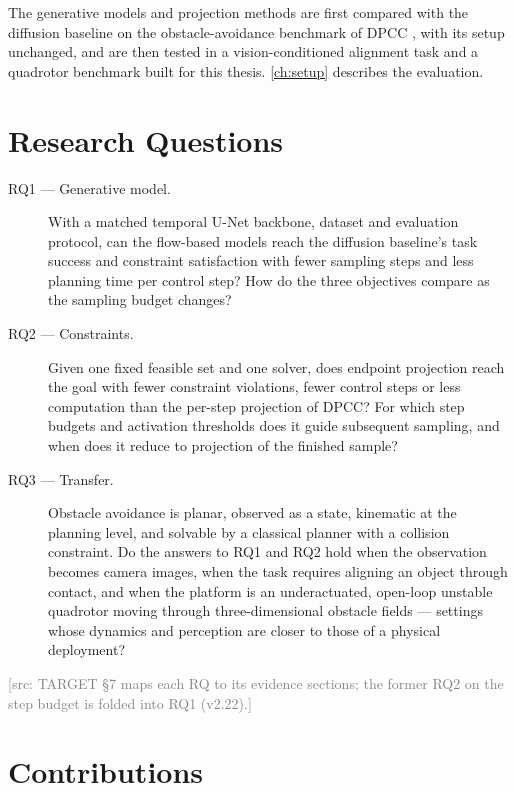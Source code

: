 \documentclass[headsepline,footsepline,footinclude=false,oneside,fontsize=11pt,paper=a4,listof=totoc,bibliography=totoc]{scrbook}
\theoremstyle{definition}
\theoremstyle{plain}
\theoremstyle{remark}
\newif\ifsubmission
\newcommand{\srcnote}[1]{\ifsubmission\else\textcolor{gray}{\footnotesize\textsf{[src: #1]}}\fi}
\begin{document}
The generative models and projection methods are first compared with the diffusion baseline on the
obstacle-avoidance benchmark of \ac{DPCC} \parencite{romer2025diffusion,jia2024towards}, with its
setup unchanged, and are then tested in a vision-conditioned alignment task and a quadrotor benchmark
built for this thesis. \autoref{ch:setup} describes the evaluation.

\section{Research Questions}\label{sec:intro:rqs}

\begin{description}
  \item[RQ1 --- Generative model.] With a matched temporal U-Net backbone, dataset and evaluation
    protocol, can the flow-based models reach the diffusion baseline's task success and constraint
    satisfaction with fewer sampling steps and less planning time per control step? How do the three
    objectives compare as the sampling budget changes?
  \item[RQ2 --- Constraints.] Given one fixed feasible set and one solver, does endpoint projection
    reach the goal with fewer constraint violations, fewer control steps or less computation than
    the per-step projection of \ac{DPCC}? For which step budgets and activation thresholds does it
    guide subsequent sampling, and when does it reduce to projection of the finished sample?
  \item[RQ3 --- Transfer.] Obstacle avoidance is planar, observed as a state, kinematic at the
    planning level, and solvable by a classical planner with a collision constraint. Do the answers
    to RQ1 and RQ2 hold when the observation becomes camera images, when the task requires aligning
    an object through contact, and when the platform is an underactuated, open-loop unstable
    quadrotor moving through three-dimensional obstacle fields --- settings whose dynamics and
    perception are closer to those of a physical deployment?
\end{description}

\srcnote{TARGET \S7 maps each RQ to its evidence sections; the former RQ2 on the step budget is
folded into RQ1 (v2.22).}

\section{Contributions}\label{sec:intro:contributions}
\end{document}
